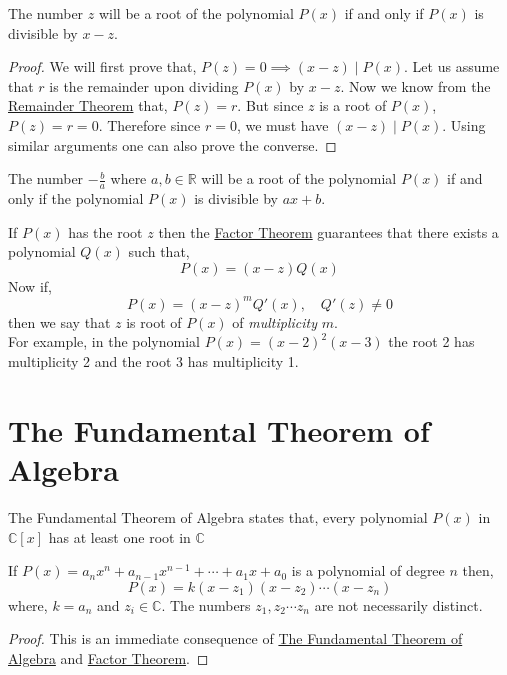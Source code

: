 \documentclass[11pt,numbers=noenddot,svgnames,dvipsnames]{scrartcl}
\begin{document}
\begin{theorem}\label{thm:factor-theorem}
    The number $z$ will be a root of the polynomial $P(x)$ if and only if $P(x)$ is divisible by $x-z$.
\end{theorem}
\begin{proof}
    We will first prove that, $P(z)=0 \implies (x-z) \mid P(x)$. 
    Let us assume that $r$ is the remainder upon dividing $P(x)$ by $x-z$. 
    Now we know from the \hyperref[thm:remainder-theorem]{Remainder Theorem} that, $P(z)=r$. 
    But since $z$ is a root of $P(x)$, $P(z)=r=0$. Therefore since $r=0$, we must have $(x-z)\mid P(x)$. 
    Using similar arguments one can also prove the converse. 
\end{proof}
\begin{corollary}
    The number $-\frac{b}{a}$ where $a, b\in \mathbb{R}$ will be a root of the polynomial $P(x)$ if and only if the 
    polynomial $P(x)$ is divisible by $ax+b$.
\end{corollary}

If $P(x)$ has the root $z$ then the \hyperref[thm:factor-theorem]{Factor Theorem} guarantees that there exists a polynomial 
$Q(x)$ such that,
\[
    P(x) = \left(x - z\right)Q(x)
\]
Now if,
\[
    P(x) = \left(x-z\right)^{m}Q'(x), \quad Q'(z) \neq 0
\]
then we say that $z$ is root of $P(x)$ of \textit{multiplicity} $m$. \\
For example, in the polynomial $P(x)=\left(x-2\right)^{2}\left(x-3\right)$ 
the root 2 has multiplicity 2 and the root 3 has multiplicity 1.

\section{The Fundamental Theorem of Algebra}

\begin{theorem}\label{thm:fta}
    The Fundamental Theorem of Algebra states that, every polynomial $P(x)$ in $\mathbb{C}[x]$ has at least 
    one root in $\mathbb{C}$
\end{theorem}
\begin{corollary}
    If $P(x) = a_{n}x^{n} + a_{n-1}x^{n-1} + \cdots + a_{1}x + a_{0}$ is a polynomial of degree $n$ then,
    \[
        P(x) = k(x - z_{1})(x - z_{2})\cdots (x - z_{n})
    \]
    where, $k = a_{n}$ and $z_{i} \in \mathbb{C}$. The numbers $z_{1},z_{2}\cdots z_{n}$ are not necessarily 
    distinct.
\end{corollary}
\begin{proof}
    This is an immediate consequence of \hyperref[thm:fta]{The Fundamental Theorem of Algebra} 
    and \hyperref[thm:factor-theorem]{Factor Theorem}.
\end{proof}
\end{document}
